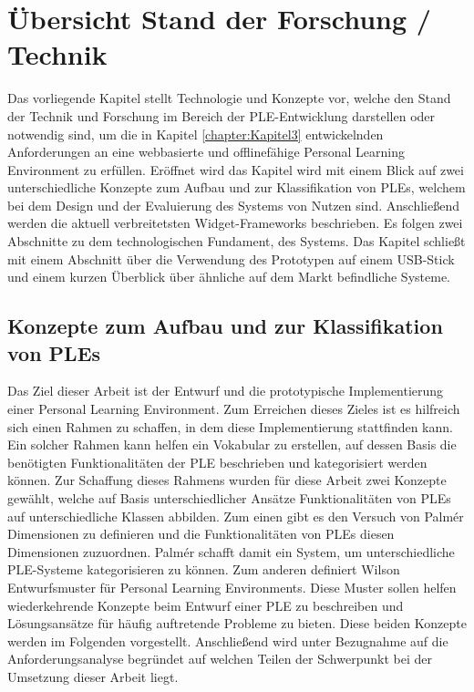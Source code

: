 \chapter{Übersicht Stand der Forschung / Technik} 
\label{chapter:Kapitel4}

Das vorliegende Kapitel stellt Technologie und Konzepte vor, welche den Stand der Technik und Forschung im Bereich der PLE-Entwicklung darstellen oder notwendig sind, um die in Kapitel \ref{chapter:Kapitel3} entwickelnden Anforderungen an eine webbasierte und offlinefähige Personal Learning Environment zu erfüllen. Eröffnet wird das Kapitel wird mit einem Blick auf zwei unterschiedliche Konzepte zum Aufbau und zur Klassifikation von PLEs, welchem bei dem Design und der Evaluierung des Systems von Nutzen sind. Anschließend werden die aktuell verbreitetsten Widget-Frameworks beschrieben. Es folgen zwei Abschnitte zu dem technologischen Fundament, des Systems. Das Kapitel schließt mit einem Abschnitt über die Verwendung des Prototypen auf einem USB-Stick und einem kurzen Überblick über ähnliche auf dem Markt befindliche Systeme. 

\section{Konzepte zum Aufbau und zur Klassifikation von PLEs}
Das Ziel dieser Arbeit ist der Entwurf und die prototypische Implementierung einer Personal Learning Environment. Zum Erreichen dieses Zieles ist es hilfreich sich einen Rahmen zu schaffen, in dem diese Implementierung stattfinden kann. Ein solcher Rahmen kann helfen ein Vokabular zu erstellen, auf dessen Basis die benötigten Funktionalitäten der PLE  beschrieben und kategorisiert werden können. Zur Schaffung dieses Rahmens wurden für diese Arbeit zwei Konzepte gewählt, welche auf Basis unterschiedlicher Ansätze Funktionalitäten von PLEs auf unterschiedliche Klassen abbilden. Zum einen gibt es den Versuch von Palmér Dimensionen zu definieren und die Funktionalitäten von PLEs diesen Dimensionen zuzuordnen. Palmér schafft damit ein System, um unterschiedliche PLE-Systeme kategorisieren zu können. Zum anderen definiert Wilson Entwurfsmuster für Personal Learning Environments. Diese Muster sollen helfen wiederkehrende Konzepte beim Entwurf einer PLE zu beschreiben und Lösungsansätze für häufig auftretende Probleme zu bieten. Diese beiden Konzepte werden im Folgenden vorgestellt. Anschließend wird unter Bezugnahme auf die Anforderungsanalyse begründet auf welchen Teilen der Schwerpunkt bei der Umsetzung dieser Arbeit liegt.

